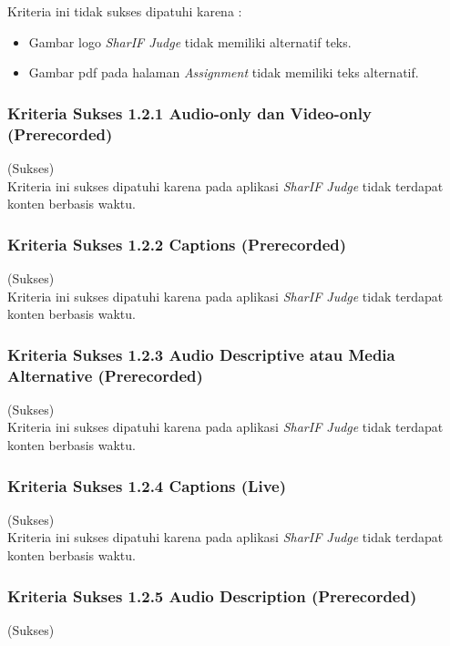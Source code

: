 Kriteria ini tidak sukses dipatuhi karena :
\begin{itemize}
	\item Gambar logo \textit{SharIF Judge} tidak memiliki alternatif teks.
	\item Gambar pdf pada halaman \textit{Assignment} tidak memiliki teks alternatif.
\end{itemize}

\subsubsection{Kriteria Sukses 1.2.1 Audio-only dan Video-only (Prerecorded)}
\label{subsubsec:kepatuhan_kriteria_1.2.1}
(Sukses) \\

Kriteria ini sukses dipatuhi karena pada aplikasi \textit{SharIF Judge} tidak terdapat konten berbasis waktu.

\subsubsection{Kriteria Sukses 1.2.2 Captions (Prerecorded)}
\label{subsubsec:kepatuhan_kriteria_1.2.2}
(Sukses) \\

Kriteria ini sukses dipatuhi karena pada aplikasi \textit{SharIF Judge} tidak terdapat konten berbasis waktu.

\subsubsection{Kriteria Sukses 1.2.3 Audio Descriptive atau Media Alternative (Prerecorded)}
\label{subsubsec:kepatuhan_kriteria_1.2.3}
(Sukses) \\

Kriteria ini sukses dipatuhi karena pada aplikasi \textit{SharIF Judge} tidak terdapat konten berbasis waktu.

\subsubsection{Kriteria Sukses 1.2.4 Captions (Live)}
\label{subsubsec:kepatuhan_kriteria_1.2.4}
(Sukses) \\

Kriteria ini sukses dipatuhi karena pada aplikasi \textit{SharIF Judge} tidak terdapat konten berbasis waktu.

\subsubsection{Kriteria Sukses 1.2.5 Audio Description (Prerecorded)}
\label{subsubsec:kepatuhan_kriteria_1.2.5}
(Sukses) \\

